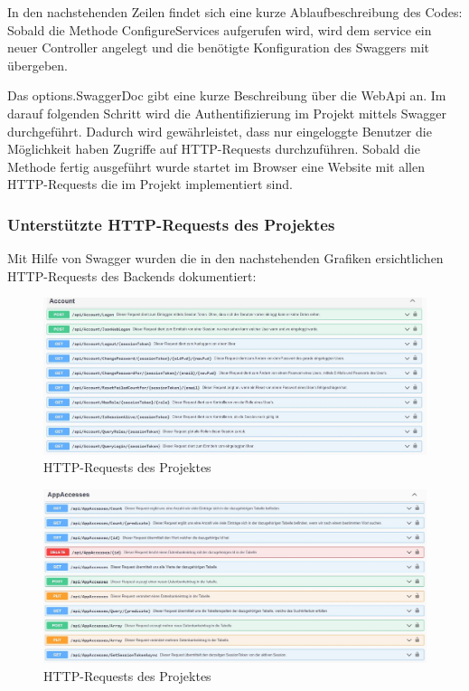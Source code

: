 In den nachstehenden Zeilen findet sich eine kurze Ablaufbeschreibung des Codes:
Sobald die Methode ConfigureServices aufgerufen wird, wird dem service ein neuer Controller angelegt und die benötigte Konfiguration des Swaggers mit übergeben. 

Das options.SwaggerDoc gibt eine kurze Beschreibung über die WebApi an.
Im darauf folgenden Schritt wird die Authentifizierung im Projekt mittels Swagger durchgeführt. Dadurch wird gewährleistet, dass nur eingeloggte Benutzer die Möglichkeit haben Zugriffe auf HTTP-Requests durchzuführen.
Sobald die Methode fertig ausgeführt wurde startet im Browser eine Website mit allen HTTP-Requests die im Projekt implementiert sind.

\subsubsection*{Unterstützte HTTP-Requests des Projektes}
Mit Hilfe von Swagger wurden die in den nachstehenden Grafiken ersichtlichen HTTP-Requests des Backends dokumentiert:

\begin{figure}[H]
    \flushleft
    \includegraphics[width=1.6\textwidth]{pics/WebApiRequests1.JPG}
    \caption{HTTP-Requests des Projektes}
\end{figure}

\begin{figure}[H]
    \centering
    \includegraphics[width=1.6\textwidth]{pics/WebApiRequests2.JPG}
    \caption{HTTP-Requests des Projektes}
\end{figure}

